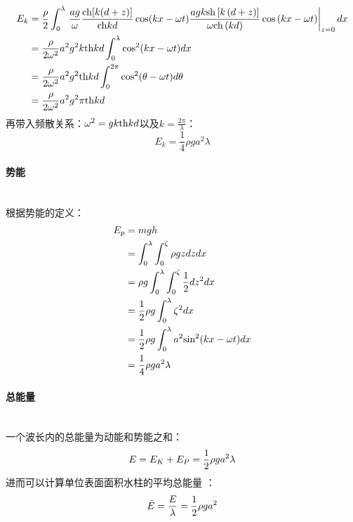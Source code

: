 \documentclass[a4paper,12pt]{article}
\begin{document}
	\[
	\begin{aligned}
	{E_k} &= {\rho  \over 2}\int_0^\lambda  {\left. {{ag} \over \omega }{{{\rm{ch}} [k(d + z)]} \over {{\rm{ch}} kd}}\cos (kx - \omega t)\frac{agk\mathrm{sh}\left[k\left(d+z\right) \right]}{\omega \mathrm{ch}\left(kd\right)}\cos\left(kx-\omega t\right) \right|_{z = 0}dx} \\
	&= \frac{\rho}{2\omega^2} a^2g^2k \mathrm{th}kd \int_0^\lambda {\mathrm{cos}^2(kx-\omega t)dx}\\
	&= \frac{\rho}{2\omega^2} a^2g^2 \mathrm{th}kd \int_0^{2\pi} {\mathrm{cos}^2(\theta-\omega t)d\theta}\\
	&= \frac{\rho}{2\omega^2} a^2g^2 \pi\mathrm{th}kd
	\end{aligned}
	\]
	\indent
	再带入频散关系：${\omega ^2} = gk {\rm th} kd$以及$k=\frac{2\pi}{\lambda}$：
	\[
	E_k=\frac{1}{4}\rho ga^2\lambda
	\]
	\paragraph{势能}~{}\\
	根据势能的定义：
	\[
	\begin{aligned}
		E_p &= mgh\\
		    &= \int_0^\lambda  {\int_0^\zeta  {\rho gzdzdx} }\\
		    &= \rho g\int_0^\lambda  {\int_0^\zeta  {{1 \over 2}d{z^2}dx} } \\
		    &= {1 \over 2}\rho g\int_0^\lambda  {\zeta^2 dx } \\
		    &= {1 \over 2}\rho g\int_0^\lambda  {{a^2}{{\sin }^2}(kx - \omega t)dx}\\
		    &= {1 \over 4}\rho g{a^2}\lambda
	\end{aligned}
	\]
	\paragraph{总能量}~{}\\
	一个波长内的总能量为动能和势能之和：
	\[
	E = {E_K} + {E_P} = {1 \over 2}\rho g{a^2}\lambda
	\]
	\indent
	进而可以计算单位表面面积水柱的平均总能量 ：
	\[
	\bar E = \frac{E}{\lambda} = {1 \over 2}\rho g{a^2}
	\]
\end{document}

